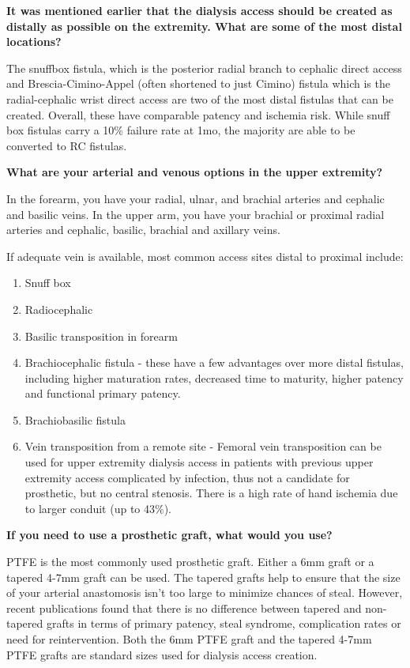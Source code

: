 \documentclass[
]{book}
\begin{document}
\textbf{It was mentioned earlier that the dialysis access should be created as
distally as possible on the extremity. What are some of the most distal
locations?}

The snuffbox fistula, which is the posterior radial branch to cephalic
direct access and Brescia-Cimino-Appel (often shortened to just Cimino)
fistula which is the radial-cephalic wrist direct access are two of the
most distal fistulas that can be created. Overall, these have comparable
patency and ischemia risk. While snuff box fistulas carry a 10\% failure
rate at 1mo, the majority are able to be converted to RC
fistulas.\citep{siracuse2019}

\textbf{What are your arterial and venous options in the upper extremity?}

In the forearm, you have your radial, ulnar, and brachial arteries and
cephalic and basilic veins. In the upper arm, you have your brachial or
proximal radial arteries and cephalic, basilic, brachial and axillary
veins.

If adequate vein is available, most common access sites distal to
proximal include:

\begin{enumerate}
\def\labelenumi{\arabic{enumi}.}
\item
  Snuff box
\item
  Radiocephalic
\item
  Basilic transposition in forearm
\item
  Brachiocephalic fistula - these have a few advantages over more
  distal fistulas, including higher maturation rates, decreased time
  to maturity, higher patency and functional primary
  patency.\citep{nguyen2007}
\item
  Brachiobasilic fistula\citep{gilmore2006}
\item
  Vein transposition from a remote site - Femoral vein transposition
  can be used for upper extremity dialysis access in patients with
  previous upper extremity access complicated by infection, thus not a
  candidate for prosthetic, but no central stenosis. There is a high
  rate of hand ischemia due to larger conduit (up to 43\%).\citep{huber2004}
\end{enumerate}

\textbf{If you need to use a prosthetic graft, what would you use?}

PTFE is the most commonly used prosthetic graft. Either a 6mm graft or a
tapered 4-7mm graft can be used. The tapered grafts help to ensure that
the size of your arterial anastomosis isn't too large to minimize
chances of steal. However, recent publications found that there is no
difference between tapered and non-tapered grafts in terms of primary
patency, steal syndrome, complication rates or need for
reintervention.\citep{roberts2019, han2017} Both the 6mm PTFE graft and the
tapered 4-7mm PTFE grafts are standard sizes used for dialysis access
creation.
\end{document}
